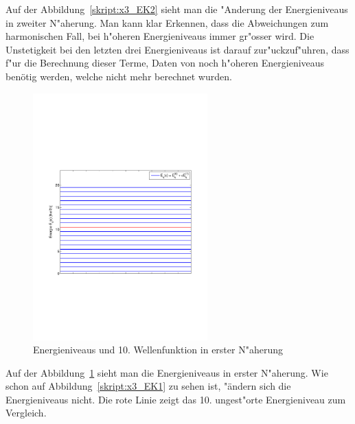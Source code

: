\begin{refsection}
Auf der Abbildung~\ref{skript:x3_EK2} sieht man die "Anderung der Energieniveaus in zweiter N"aherung. Man kann klar Erkennen, dass die Abweichungen zum harmonischen Fall, bei h"oheren Energieniveaus immer gr"osser wird. Die Unstetigkeit bei den letzten drei Energieniveaus ist darauf zur"uckzuf"uhren, dass f"ur die Berechnung dieser Terme, Daten von noch h"oheren Energieniveaus benötig werden, welche nicht mehr berechnet wurden. 

\begin{figure}[h]	%
\centering
\includegraphics[width=0.6\textwidth]{anharmonisch/images/x3/Energie(1Stoerung_0135).pdf}
\caption{Energieniveaus und 10. Wellenfunktion in erster N"aherung
\label{skript:x3_Energie(1Stoerung_0135)}}
\end{figure}

Auf der Abbildung~\ref{skript:x3_Energie(1Stoerung_0135)} sieht man die Energieniveaus in erster N"aherung. Wie schon auf Abbildung~\ref{skript:x3_EK1} zu sehen ist, "ändern sich die Energieniveaus nicht. Die rote Linie zeigt das 10. ungest"orte Energieniveau zum Vergleich.


\end{refsection}
